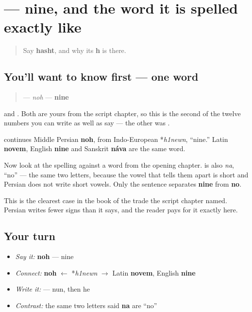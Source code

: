 \section[\texorpdfstring{\fa{نه} (noh)}{نه (noh)}]{ — nine, and the word it is spelled exactly like}

\label{lesson:FA-C17-noh}



\begin{quote}
Say \textbf{hasht}, and why its \textbf{h} is there.
\end{quote}

\subsection*{You'll want to know first — one word}
\begin{quote}
\textbf{} — \emph{noh} — \textbf{nine}
\end{quote}

\textbf{} and \textbf{}. Both are yours from the script chapter, so this is the second of the twelve numbers you can write as well as say — the other was \textbf{}.

\begin{cousinweb}
\textbf{} continues Middle Persian \textbf{noh}, from Indo-European *\emph{h1newn}, \textquotedblleft{}nine.\textquotedblright{} Latin \textbf{novem}, English \textbf{nine} and Sanskrit \textbf{náva} are the same word.

Now look at the spelling against a word from the opening chapter. \textbf{} is also \emph{na}, \textquotedblleft{}no\textquotedblright{} — the same two letters, because the vowel that tells them apart is short and Persian does not write short vowels. Only the sentence separates \textbf{nine} from \textbf{no}.

This is the clearest case in the book of the trade the script chapter named. Persian writes fewer signs than it says, and the reader pays for it exactly here.
\end{cousinweb}

\subsection*{Your turn}
\begin{itemize}
\raggedright
  \item \emph{Say it:} \textbf{noh} — nine
  \item \emph{Connect:} \textbf{noh} $\leftarrow$ *\emph{h1newn} $\to$ Latin \textbf{novem}, English \textbf{nine}
  \item \emph{Write it:} \textbf{} — nun, then he
  \item \emph{Contrast:} the same two letters said \textbf{na} are \textquotedblleft{}no\textquotedblright{}
\end{itemize}

